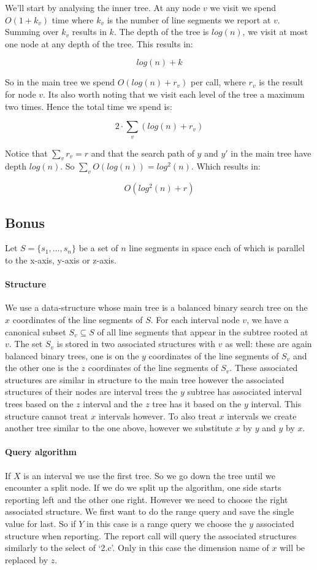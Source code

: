 \documentclass{article}
\begin{document}
We'll start by analysing the inner tree.
At any node $v$ we visit we spend $O(1+k_v)$ time where
$k_v$ is the number of line segments we report at $v$. Summing
over $k_v$ results in $k$. The depth of the tree is $log(n)$,
we visit at most one node at any depth of the tree. This results in:

\[ log(n)+k\]

So in the main tree we spend $O(log(n)+r_v)$ per call, where $r_v$ is
the result for node $v$. Its also worth noting that we visit each level
of the tree a maximum two times. Hence the total time we spend is:

\[ 2\cdot \sum_v(log(n)+r_v)\]

Notice that $\sum_v r_v = r$ and that the search path of $y$ and $y'$
in the main tree have depth $log(n)$. So $\sum_v O(log(n))=log^2(n)$.
Which results in:

\[ O(log^2(n)+r) \]

\newpage
\subsection{Bonus}
Let $S=\{s_1,\dots,s_n\}$ be a set of $n$ line segments in space each
of which is parallel to the x-axis, y-axis or z-axis.
\paragraph{Structure} We use a data-structure whose main tree is a balanced
binary search tree on the $x$ coordinates of the line segments of $S$.
For each interval node $v$, we have a canonical subset $S_v\subseteq S$
of all line segments that appear in the subtree rooted at $v$. The
set $S_v$ is stored in two associated structures with $v$ as well:
these are again balanced binary trees, one is on the $y$ coordinates
of the line segments of $S_v$ and the other one is the $z$ coordinates
of the line segments of $S_v$. These associated structures are similar
in structure to the main tree however the associated structures of their
nodes are interval trees the $y$
subtree has associated interval trees based on the $z$ interval and
the $z$ tree has it based on the $y$ interval.
This structure cannot treat $x$ intervals however. To also treat
$x$ intervals we create another tree similar to the one above, however
we substitute $x$ by $y$ and $y$ by $x$.
\paragraph{Query algorithm} If $X$ is an interval we use the first tree.
So we go down the tree until we encounter a split node. If we do we
split up the algorithm, one side starts reporting left and the other one
right. However we need to choose the right associated
structure. We first want to do the range query and save the single value for
last. So if $Y$ in this case is a range query we choose the $y$ associated
structure when reporting.
The report call will query the associated structures similarly
to the select of `2.c'. Only in this case the dimension name of $x$ will be
replaced by $z$.
\end{document}
